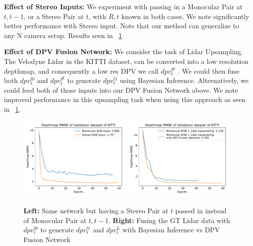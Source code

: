 \textbf{Effect of Stereo Inputs:} We experiment with passing in a Monocular Pair at $t, t-1$, or a Stereo Pair at $t$, with $R,t$ known in both cases. We note significantly better performance with Stereo input. Note that our method can generalize to any N camera setup. Results seen in ~\ref{fig:stereodpv}

\textbf{Effect of DPV Fusion Network:} We consider the task of Lidar Upsampling. The Velodyne Lidar in the KITTI dataset, can be converted into a low resolution depthmap, and consequently a low res DPV we call $dpv_{t}^{gt}$ . We could then fuse both $dpv_{t}^{l0}$ and $dpv_{t}^{gt}$ to generate $dpv_{t}^{l1}$ using Bayesian Inference. Alternatively, we could feed both of those inputs into our DPV Fusion Network above. We note improved performance in this upsampling task when using this approach as seen in ~\ref{fig:stereodpv}. 

\begin{figure}[H]
   \centering
   \begin{minipage}{0.5\textwidth}
       \centering
       \includegraphics[width=0.49\textwidth]{figures/Figure_6.pdf}
       \includegraphics[width=0.49\textwidth]{figures/Figure_7.pdf}
   \end{minipage}\hfill
   \centering
   \caption{ \textbf{Left:} Same network but having a Stereo Pair at $t$ passed in instead of Monocular Pair at $t, t-1$. \textbf{Right:} Fusing the GT Lidar data with $dpv_{t}^{l0}$ to generate $dpv_{t}^{l1}$ and $dpv_{t}^{L}$ with Bayesian Inference vs DPV Fusion Network}
   \label{fig:stereodpv} 
\end{figure}

